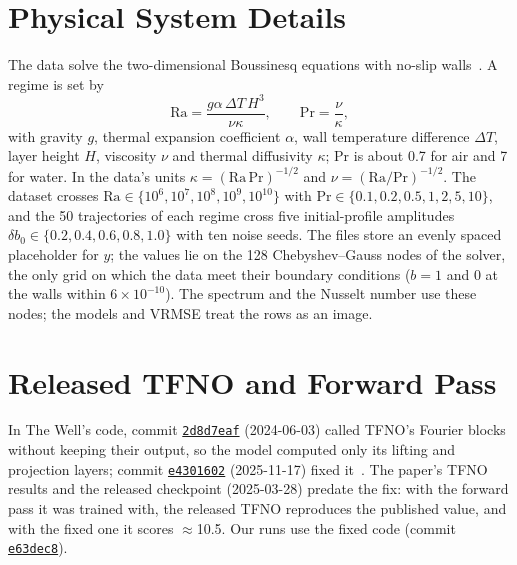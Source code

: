 \documentclass[11pt]{article}
\begin{document}


\appendix

\section{Physical System Details}
\label{app:rb_regimes}

The data solve the two-dimensional Boussinesq equations with no-slip walls~\cite{wellrb}. A regime is set by
\begin{equation}
    \mathrm{Ra} = \frac{g\alpha\,\Delta T\,H^3}{\nu\kappa}, \qquad \mathrm{Pr} = \frac{\nu}{\kappa},
\end{equation}
with gravity $g$, thermal expansion coefficient $\alpha$, wall temperature difference $\Delta T$, layer height $H$,
viscosity $\nu$ and thermal diffusivity $\kappa$; $\mathrm{Pr}$ is about 0.7 for air and 7 for water. In the data's
units $\kappa=(\mathrm{Ra}\,\mathrm{Pr})^{-1/2}$ and $\nu=(\mathrm{Ra}/\mathrm{Pr})^{-1/2}$. The dataset crosses
$\mathrm{Ra}\in\{10^6,10^7,10^8,10^9,10^{10}\}$ with $\mathrm{Pr}\in\{0.1,0.2,0.5,1,2,5,10\}$, and the 50
trajectories of each regime cross five initial-profile amplitudes $\delta b_0\in\{0.2,0.4,0.6,0.8,1.0\}$ with ten
noise seeds. The files store an evenly spaced placeholder for $y$; the values lie on the 128 Chebyshev--Gauss nodes
of the solver, the only grid on which the data meet their boundary conditions ($b=1$ and 0 at the walls within
$6\times10^{-10}$). The spectrum and the Nusselt number use these nodes; the models and VRMSE treat the rows as an
image.

\section{Released TFNO and Forward Pass}
\label{app:tfno}
In The Well's code, commit
\href{https://github.com/PolymathicAI/the_well/commit/2d8d7eaf9eb46b96f215abf39c94b6be4bf9ea5c}{\texttt{2d8d7eaf}}
(2024-06-03) called TFNO's Fourier blocks without keeping their output, so the model computed only its lifting and
projection layers; commit
\href{https://github.com/PolymathicAI/the_well/commit/e4301602e57f2dddeaa87856dda49bbba47c663b}{\texttt{e4301602}}
(2025-11-17) fixed it~\cite{wellfix}. The paper's TFNO results and the released checkpoint (2025-03-28) predate the
fix: with the forward pass it was trained with, the released TFNO reproduces the published value, and with the fixed
one it scores $\approx$10.5. Our runs use the fixed code (commit
\href{https://github.com/PolymathicAI/the_well/commit/e63dec8ded515be864755eaf595d39fea409e335}{\texttt{e63dec8}}).
\end{document}
